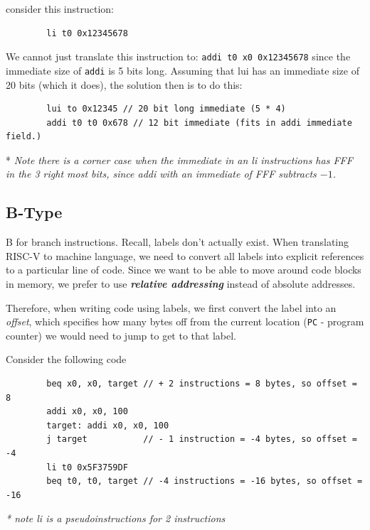 \documentclass[12pt]{article}
\begin{document}
\begin{example}
    consider this instruction:
    \begin{lstlisting}
        li t0 0x12345678
    \end{lstlisting}
    We cannot just translate this instruction to: \lstinline{addi t0 x0 0x12345678} since the immediate size of \lstinline{addi} is 5 bits long. Assuming that lui has an immediate size of 20 bits (which it does), the solution then is to do this:

    \begin{lstlisting}
        lui to 0x12345 // 20 bit long immediate (5 * 4)
        addi t0 t0 0x678 // 12 bit immediate (fits in addi immediate field.)
    \end{lstlisting}
    * \emph{Note there is a corner case when the immediate in an li instructions has FFF in the 3 right most bits, since addi with an immediate of FFF subtracts $-1$. }
\end{example}

\subsection*{B-Type}
B for branch instructions. Recall, labels don't actually exist. When translating RISC-V to machine language, we need to convert all labels into explicit references to a particular line of code. Since we want to be able to move around code blocks in memory, we prefer to use \textbf{\emph{relative addressing}} instead of absolute addresses.

Therefore, when writing code using labels, we first convert the label into an \emph{offset}, which specifies how many bytes off from the current location (\lstinline{PC} - program counter) we would need to jump to get to that label.

\begin{example}
    Consider the following code
    \begin{lstlisting}
        beq x0, x0, target // + 2 instructions = 8 bytes, so offset = 8
        addi x0, x0, 100
        target: addi x0, x0, 100 
        j target           // - 1 instruction = -4 bytes, so offset = -4
        li t0 0x5F3759DF
        beq t0, t0, target // -4 instructions = -16 bytes, so offset = -16
    \end{lstlisting}
    \emph{* note li is a pseudoinstructions for 2 instructions}
\end{example}
\end{document}
